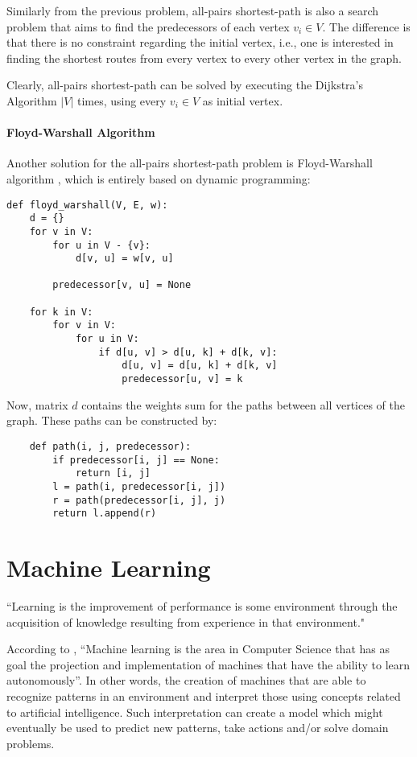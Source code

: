 Similarly from the previous problem, all-pairs shortest-path is also a search problem that aims to find the predecessors of each vertex $v_i \in V$. The difference is that there is no constraint regarding the initial vertex, i.e., one is interested in finding the shortest routes from every vertex to every other vertex in the graph.

Clearly, all-pairs shortest-path can be solved by executing the Dijkstra's Algorithm $|V|$ times, using every $v_i \in V$ as initial vertex.

\paragraph{Floyd-Warshall Algorithm}

Another solution for the all-pairs shortest-path problem is Floyd-Warshall algorithm \cite{golin2003floydwarshall}, which is entirely based on dynamic programming:

\begin{verbatim}
def floyd_warshall(V, E, w):
    d = {}
    for v in V:
        for u in V - {v}:
            d[v, u] = w[v, u]

        predecessor[v, u] = None

    for k in V:
        for v in V:
            for u in V:
                if d[u, v] > d[u, k] + d[k, v]:
                    d[u, v] = d[u, k] + d[k, v]
                    predecessor[u, v] = k
\end{verbatim}

Now, matrix $d$ contains  the weights sum for the paths between all vertices of the graph. These paths can be constructed by:
\begin{verbatim}
	def path(i, j, predecessor):
		if predecessor[i, j] == None:
			return [i, j]
		l = path(i, predecessor[i, j])
		r = path(predecessor[i, j], j)
		return l.append(r)
\end{verbatim}

\clearpage
\section{Machine Learning}
“Learning is the improvement of performance is some environment through the acquisition of knowledge resulting from experience in that environment." \cite{pat1996}

According to \cite{hot2009}, “Machine learning is the area in Computer Science that has as goal the projection and implementation of machines that have the ability to learn autonomously”. In other words, the creation of machines that are able to recognize patterns in an environment and interpret those using concepts related to artificial intelligence. Such interpretation can create a model which might eventually be used to predict new patterns, take actions and/or solve domain problems.

